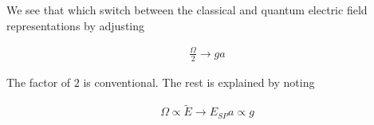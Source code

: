 \documentclass[12pt]{article}
\begin{document}
We see that which switch between the classical and quantum electric field representations by adjusting

\begin{align}
\frac{\Omega}{2} \rightarrow ga
\end{align}

The factor of $2$ is conventional.
The rest is explained by noting

\begin{align}
\Omega \propto \tilde{E} \rightarrow E_{SP} a \propto g
\end{align}
\end{document}
